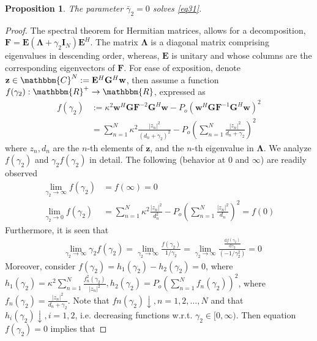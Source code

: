 \documentclass[11pt,draftclsnofoot,onecolumn]{IEEEtran}
\newtheorem{prop}{\bf{Proposition}}
\theoremstyle{definition}
\theoremstyle{remark}
\begin{document}
\begin{prop} \label{propos3}
The parameter $\bar{\gamma}_2=0$ solves \eqref{eq31}.
\end{prop}

\begin{proof}
The spectral theorem for Hermitian matrices, allows for a decomposition, $\mathbf{F}=\mathbf{E}(\boldsymbol{\Lambda}+\gamma_2\mathbf{I}_N)\mathbf{E}^H$. The matrix $\boldsymbol{\Lambda}$ is a diagonal matrix comprising eigenvalues in descending order, whereas, $\mathbf{E}$ is unitary and whose columns are the corresponding eigenvectors of $\mathbf{F}$. For ease of exposition, denote $\mathbf{z}\in\mathbbm{C}^{N}:=\mathbf{E}^H\mathbf{G}^H\mathbf{w}$, then assume a function $f(\gamma_2):\mathbbm{R}^{+}\rightarrow\mathbbm{R}$, expressed as
\begin{align} \label{lagra2}
f(\gamma_2)&:=\kappa^2\mathbf{w}^H\mathbf{G}\mathbf{F}^{-2}\mathbf{G}^H\mathbf{w}-P_o( \mathbf{w}^H\mathbf{G}\mathbf{F}^{-1}\mathbf{G}^H\mathbf{w})^2 \nonumber \\
&=\sum\limits_{n=1}^N  \kappa^2\frac{|z_n|^2}{(d_n+\gamma_2)^2} -P_o\left( \sum\limits_{n=1}^N \frac{|z_n|^2}{d_n+\gamma_2}\right)^2
\end{align}
where $z_n,d_n$ are the $n$-th elements of $\mathbf{z}$, and the $n$-th eigenvalue in $\boldsymbol{\Lambda}$. We analyze $f(\gamma_2)$ and $\gamma_2f(\gamma_2)$ in detail. The following (behavior at $0$ and $\infty$) are readily observed
\begin{subequations} \label{lagra3}
\begin{align}
\lim_{\gamma_2\rightarrow \infty}f(\gamma_2)&=f(\infty) =0 \label{lagra32}\\
\lim_{\gamma_2\rightarrow 0}f(\gamma_2)&=\sum\limits_{n=1}^N \kappa^2\frac{|z_n|^2}{d_n^2} -P_o\left(  \sum\limits_{n=1}^N\frac{|z_n|^2}{d_n}\right)^2=f(0) \label{lagra31}
\end{align}
\end{subequations}
 Furthermore, it is seen that
\begin{equation}  \label{lagra4}
\begin{aligned}
&\lim_{\gamma_2\rightarrow\infty}\gamma_2f(\gamma_2)=\lim_{\gamma_2\rightarrow\infty}\frac{f(\gamma_2)}{1/\gamma_2}=\lim_{\gamma_2\rightarrow\infty}\frac{\frac{\mathrm{d}f(\gamma_2)}{\mathrm{d}\gamma_2}}{(-1/\gamma_2^2)} =0
\end{aligned}
\end{equation}
Moreover, consider $f(\gamma_2)=h_1(\gamma_2)-h_2(\gamma_2)=0$, where $h_1(\gamma_2)=\kappa^2\sum\limits_{n=1}^N\frac{f_n^2(\gamma_2)}{|z_n|^2},h_2(\gamma_2)=P_o (\sum\limits_{n=1}^N f_n(\gamma_2))^2$, where $f_n(\gamma_2)=\frac{|z_n|^2}{d_n+\gamma_2}$. Note that $fn(\gamma_2)\downarrow, n=1,2,\ldots,N$ and that $h_i(\gamma_2)\downarrow,i=1,2$, i.e. decreasing functions w.r.t. $\gamma_2 \in[0,\infty)$. Then equation$f(\gamma_2)=0$ implies that 

\end{proof}
\end{document}
